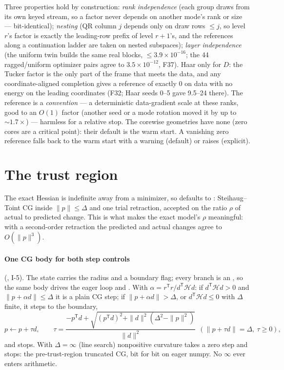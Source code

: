 \documentclass[11pt]{article}
\newcommand{\Hop}{\mathcal{H}}
\newcommand{\T}{\mathsf{T}}
\theoremstyle{definition}
\theoremstyle{plain}
\begin{document}
Three properties hold by construction: \emph{rank independence} (each group draws from its own keyed stream, so a
factor never depends on another mode's rank or size --- bit-identical); \emph{nesting} (QR column $j$ depends only on
draw rows $\le j$, so level $r$'s factor is exactly the leading-row prefix of level $r{+}1$'s, and the references
along a continuation ladder are taken on nested subspaces); \emph{layer independence} (the uniform twin builds the
same real blocks, $\le3.9\times10^{-16}$; the 44 ragged/uniform optimizer pairs agree to $3.5\times10^{-12}$, F37).
Haar only for $D$: the Tucker factor is the only part of the frame that meets the data, and any
coordinate-aligned completion gives a reference of exactly 0 on data with no energy on the leading coordinates
(F32; Haar seeds 0--5 gave 9.5--24 there). The reference is a \emph{convention} --- a deterministic data-gradient
scale at these ranks, good to an $O(1)$ factor (another seed or a mode rotation moved it by up to $\sim1.7\times$) ---
harmless for a relative stop. The corewise geometries have none (zero cores are a critical point): their default is
the warm start. A vanishing zero reference falls back to the warm start with a warning (default) or raises (explicit).

\section{The trust region}
\label{sec:tr}

The exact Hessian is indefinite away from a minimizer, so  defaults to
: Steihaug--Toint CG \cite{Ste83,NW06} inside $\|p\|\le\Delta$ and one trial
retraction, accepted on the ratio $\rho$ of actual to predicted change. This is what makes the exact model's $\rho$
meaningful: with a second-order retraction the predicted and actual changes agree to $O(\|p\|^3)$.

\paragraph{One CG body for both step controls} (, I-5). The state carries the radius and a
boundary flag; every branch is an , so the same body drives the eager loop and
. With $\alpha=r^\T r/d^\T\Hop d$: if $d^\T\Hop d>0$ and $\|p+\alpha d\|\le\Delta$ it is a plain
CG step; if $\|p+\alpha d\|>\Delta$, or $d^\T\Hop d\le0$ with $\Delta$ finite, it steps to the boundary,
\begin{equation}
  \label{eq:tau}
  p\gets p+\tau d,\qquad \tau=\frac{-p^\T d+\sqrt{(p^\T d)^2+\|d\|^2(\Delta^2-\|p\|^2)}}{\|d\|^2}\ \ (\|p+\tau d\|=\Delta,\ \tau\ge0),
\end{equation}
and stops. With $\Delta=\infty$ (line search) nonpositive curvature takes a zero step and stops: the
pre-trust-region truncated CG, bit for bit on eager numpy. No $\infty$ ever enters arithmetic.
\end{document}
